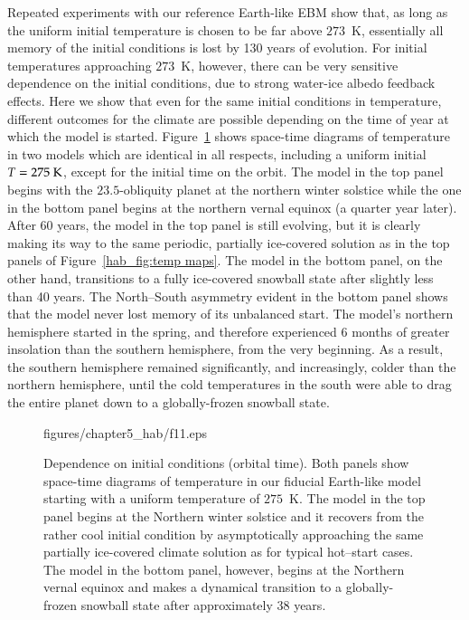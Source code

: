 Repeated experiments with our reference Earth-like EBM show that, as
long as the uniform initial temperature is chosen to be far above
$273$~K, essentially all memory of the initial conditions is lost by
130 years of evolution.  For initial temperatures approaching $273$~K,
however, there can be very sensitive dependence on the initial
conditions, due to strong water-ice albedo feedback effects.  Here we
show that even for the same initial conditions in temperature,
different outcomes for the climate are possible depending on the time
of year at which the model is started.  Figure~\ref{hab_fig:start time}
shows space-time diagrams of temperature in two models which are
identical in all respects, including a uniform initial $T=275
{\rm~K}$, except for the initial time on the orbit.  The model in the
top panel begins with the $23.5$\degr\--obliquity planet at the northern
winter solstice while the one in the bottom panel begins at the
northern vernal equinox (a quarter year later).  After 60 years, the
model in the top panel is still evolving, but it is clearly making its
way to the same periodic, partially ice-covered solution as in the top
panels of Figure~\ref{hab_fig:temp maps}. The model in the bottom panel,
on the other hand, transitions to a fully ice-covered snowball state after
slightly less than 40 years.  The North--South asymmetry evident in
the bottom panel shows that the model never lost memory of its
unbalanced start.  The model's northern hemisphere started in the
spring, and therefore experienced 6 months of greater insolation than
the southern hemisphere, from the very beginning.  As a result, the
southern hemisphere remained significantly, and increasingly, colder
than the northern hemisphere, until the cold temperatures in the south
were able to drag the entire planet down to a globally-frozen snowball
state.

\begin{figure}[p]
\plotone
{figures/chapter5_hab/f11.eps}
\caption[Dependence on initial conditions (orbital time).]{Dependence
on initial conditions (orbital time).  Both panels show space-time
diagrams of temperature in our fiducial Earth-like model starting with
a uniform temperature of $275$~K.  The model in the top panel begins
at the Northern winter solstice and it recovers from the rather cool
initial condition by asymptotically approaching the same partially
ice-covered climate solution as for typical hot--start cases.  The
model in the bottom panel, however, begins at the Northern vernal
equinox and makes a dynamical transition to a globally-frozen snowball
state after approximately 38 years.}
\label{hab_fig:start time}
\end{figure}
\afterpage{\clearpage}

\clearpage

%
\cleardoublepage


%
